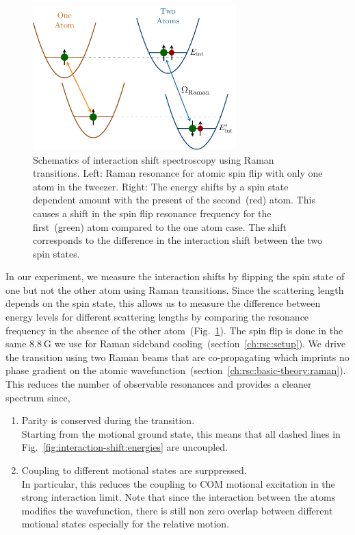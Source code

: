 \begin{figure}
  \centering
  \includegraphics[width=0.7\textwidth]{figures/interaction_shift_measure.pdf}
  \caption[Schematics of interaction shift spectroscopy.]{
    Schematics of interaction shift spectroscopy using Raman transitions.
    Left: Raman resonance for atomic spin flip with only one atom in the tweezer.
    Right: The energy shifts by a spin state dependent amount with the present of
    the second~(red) atom. This causes a shift in the spin flip resonance frequency
    for the first~(green) atom compared to the one atom case.
    The shift corresponds to the difference in the interaction shift between the
    two spin states.
    \label{fig:interaction-shift:measure}}
\end{figure}

In our experiment, we measure the interaction shifts by flipping the spin state of
one but not the other atom using Raman transitions.
Since the scattering length depends on the spin state,
this allows us to measure the difference between energy levels for different scattering lengths
by comparing the resonance frequency in the absence of
the other atom~(Fig.~\ref{fig:interaction-shift:measure}).
The spin flip is done in the same $8.8~\mathrm{G}$ we use for
Raman sideband cooling~(section~\ref{ch:rsc:setup}).
We drive the transition using two Raman beams that are co-propagating
which imprints no phase gradient on
the atomic wavefunction~(section~\ref{ch:rsc:basic-theory:raman}).
This reduces the number of observable resonances and provides a cleaner spectrum since,
\begin{enumerate}
\item Parity is conserved during the transition.\\
  Starting from the motional ground state, this means that all dashed lines in
  Fig.~\ref{fig:interaction-shift:energies} are uncoupled.
\item Coupling to different motional states are surppressed.\\
  In particular, this reduces the coupling to COM motional excitation
  in the strong interaction limit.
  Note that since the interaction between the atoms modifies the wavefunction,
  there is still non zero overlap between different motional states
  especially for the relative motion.
\end{enumerate}

